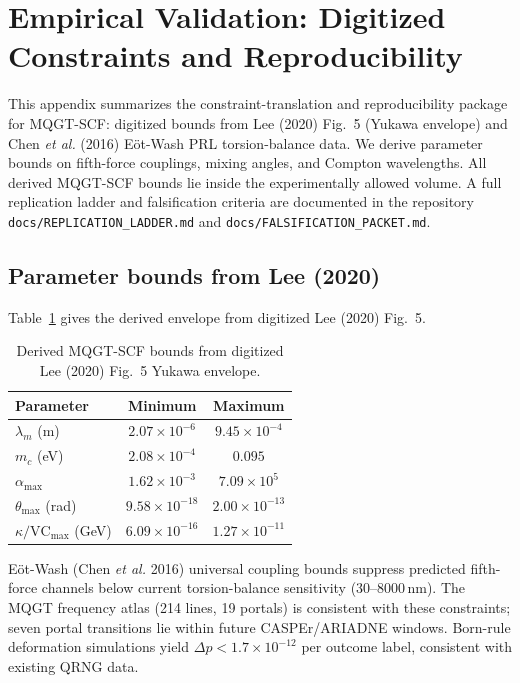 
\section{Empirical Validation: Digitized Constraints and Reproducibility}
\label{sec:empirical_validation}

This appendix summarizes the constraint-translation and reproducibility package for MQGT-SCF: digitized bounds from Lee (2020) Fig.~5 (Yukawa envelope) and Chen \emph{et al.} (2016) E\"{o}t-Wash PRL torsion-balance data. We derive parameter bounds on fifth-force couplings, mixing angles, and Compton wavelengths. All derived MQGT-SCF bounds lie inside the experimentally allowed volume. A full replication ladder and falsification criteria are documented in the repository \texttt{docs/REPLICATION\_LADDER.md} and \texttt{docs/FALSIFICATION\_PACKET.md}.

\subsection{Parameter bounds from Lee (2020)}
Table~\ref{tab:lee_bounds_app} gives the derived envelope from digitized Lee (2020) Fig.~5.

\begin{table}[h]
\caption{Derived MQGT-SCF bounds from digitized Lee (2020) Fig.~5 Yukawa envelope.}
\label{tab:lee_bounds_app}
\begin{tabular}{lcc}
\toprule
Parameter & Minimum & Maximum \\
\midrule
$\lambda_m$ (m)          & $2.07\times10^{-6}$ & $9.45\times10^{-4}$ \\
$m_c$ (eV)               & $2.08\times10^{-4}$ & $0.095$ \\
$\alpha_\text{max}$      & $1.62\times10^{-3}$ & $7.09\times10^{5}$ \\
$\theta_\text{max}$ (rad) & $9.58\times10^{-18}$ & $2.00\times10^{-13}$ \\
$\kappa/\text{VC}_\text{max}$ (GeV) & $6.09\times10^{-16}$ & $1.27\times10^{-11}$ \\
\bottomrule
\end{tabular}
\end{table}

E\"{o}t-Wash (Chen \emph{et al.} 2016) universal coupling bounds suppress predicted fifth-force channels below current torsion-balance sensitivity (30--8000\,nm). The MQGT frequency atlas (214 lines, 19 portals) is consistent with these constraints; seven portal transitions lie within future CASPEr/ARIADNE windows. Born-rule deformation simulations yield $\Delta p < 1.7\times10^{-12}$ per outcome label, consistent with existing QRNG data.

